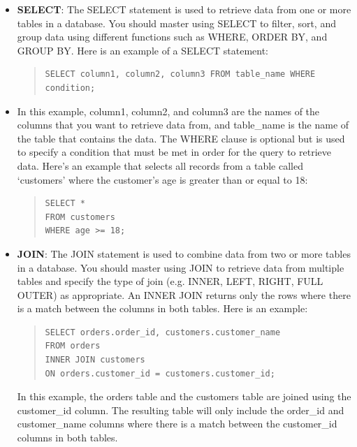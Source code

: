 \documentclass[11pt]{article}
\begin{document}
\begin{itemize}
\item \textbf{SELECT}: The SELECT statement is used to retrieve data from one or more tables in a database. You should master using SELECT to filter, sort, and group data using different functions such as WHERE, ORDER BY, and GROUP BY. Here is an example of a SELECT statement:
\begin{quote}
\begin{verbatim}
SELECT column1, column2, column3 FROM table_name WHERE condition; 
\end{verbatim}
\end{quote}
\item In this example, column1, column2, and column3 are the names of the columns that you want to retrieve data from, and table\_name is the name of the table that contains the data. The WHERE clause is optional but is used to specify a condition that must be met in order for the query to retrieve data. Here’s an example that selects all records from a table called `customers' where the customer’s age is greater than or equal to 18:
\begin{quote}
\begin{verbatim}
SELECT * 
FROM customers
WHERE age >= 18;
\end{verbatim}
\end{quote}


\item \textbf{JOIN}: The JOIN statement is used to combine data from two or more tables in a database. You should master using JOIN to retrieve data from multiple tables and specify the type of join (e.g. INNER, LEFT, RIGHT, FULL OUTER) as appropriate.
An INNER JOIN returns only the rows where there is a match between the columns in both tables. Here is an example:
\begin{quote}
\begin{verbatim}
SELECT orders.order_id, customers.customer_name
FROM orders
INNER JOIN customers
ON orders.customer_id = customers.customer_id;
\end{verbatim}
\end{quote}
In this example, the orders table and the customers table are joined using the customer\_id column. The resulting table will only include the order\_id and customer\_name columns where there is a match between the customer\_id columns in both tables.


\end{itemize}
\end{document}
